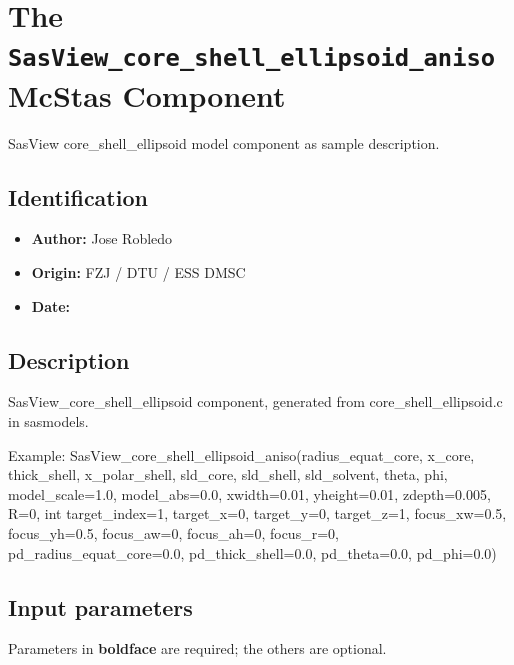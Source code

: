 \section{The \texttt{SasView\_core\_shell\_ellipsoid\_aniso} McStas Component}
SasView core\_shell\_ellipsoid model component as sample description.

\subsection*{Identification}
\begin{itemize}
  \item \textbf{Author:} Jose Robledo
  \item \textbf{Origin:} FZJ / DTU / ESS DMSC
  \item \textbf{Date:} 
\end{itemize}

\subsection*{Description}
SasView\_core\_shell\_ellipsoid component, generated from core\_shell\_ellipsoid.c in sasmodels.

Example: SasView\_core\_shell\_ellipsoid\_aniso(radius\_equat\_core, x\_core, thick\_shell, x\_polar\_shell, sld\_core, sld\_shell, sld\_solvent, theta, phi, model\_scale=1.0, model\_abs=0.0, xwidth=0.01, yheight=0.01, zdepth=0.005, R=0, int target\_index=1, target\_x=0, target\_y=0, target\_z=1, focus\_xw=0.5, focus\_yh=0.5, focus\_aw=0, focus\_ah=0, focus\_r=0, pd\_radius\_equat\_core=0.0, pd\_thick\_shell=0.0, pd\_theta=0.0, pd\_phi=0.0)

\subsection*{Input parameters}
Parameters in \textbf{boldface} are required; the others are optional.

